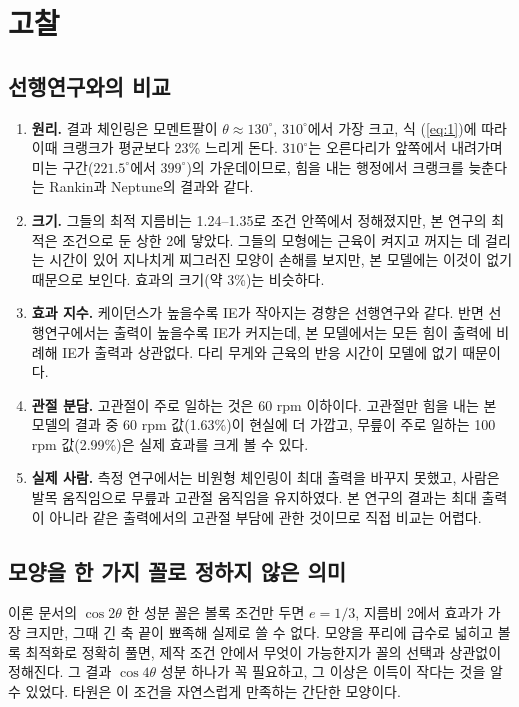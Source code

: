 \section{고찰}

\subsection{선행연구와의 비교}
\begin{enumerate}
\item \textbf{원리.} 결과 체인링은 모멘트팔이 \(\theta\approx130^\circ\), \(310^\circ\)에서 가장 크고, 식 (\ref{eq:1})에 따라 이때 크랭크가 평균보다 23\% 느리게 돈다. \(310^\circ\)는 오른다리가 앞쪽에서 내려가며 미는 구간(\(221.5^\circ\)에서 \(399^\circ\))의 가운데이므로, 힘을 내는 행정에서 크랭크를 늦춘다는 Rankin과 Neptune의 결과\cite{rankin2008}와 같다.
\item \textbf{크기.} 그들의 최적 지름비는 1.24--1.35로 조건 안쪽에서 정해졌지만, 본 연구의 최적은 조건으로 둔 상한 2에 닿았다. 그들의 모형에는 근육이 켜지고 꺼지는 데 걸리는 시간이 있어 지나치게 찌그러진 모양이 손해를 보지만, 본 모델에는 이것이 없기 때문으로 보인다. 효과의 크기(약 3\%)는 비슷하다.
\item \textbf{효과 지수.} 케이던스가 높을수록 IE가 작아지는 경향은 선행연구\cite{bini2013}와 같다. 반면 선행연구에서는 출력이 높을수록 IE가 커지는데, 본 모델에서는 모든 힘이 출력에 비례해 IE가 출력과 상관없다. 다리 무게와 근육의 반응 시간이 모델에 없기 때문이다.
\item \textbf{관절 분담.} 고관절이 주로 일하는 것은 60 rpm 이하이다\cite{aasvold2019}. 고관절만 힘을 내는 본 모델의 결과 중 60 rpm 값(1.63\%)이 현실에 더 가깝고, 무릎이 주로 일하는 100 rpm 값(2.99\%)은 실제 효과를 크게 볼 수 있다.
\item \textbf{실제 사람.} 측정 연구에서는 비원형 체인링이 최대 출력을 바꾸지 못했고, 사람은 발목 움직임으로 무릎과 고관절 움직임을 유지하였다\cite{leong2017}. 본 연구의 결과는 최대 출력이 아니라 같은 출력에서의 고관절 부담에 관한 것이므로 직접 비교는 어렵다.
\end{enumerate}

\subsection{모양을 한 가지 꼴로 정하지 않은 의미}
이론 문서의 \(\cos2\theta\) 한 성분 꼴은 볼록 조건만 두면 \(e=1/3\), 지름비 2에서 효과가 가장 크지만, 그때 긴 축 끝이 뾰족해 실제로 쓸 수 없다. 모양을 푸리에 급수로 넓히고 볼록 최적화로 정확히 풀면, 제작 조건 안에서 무엇이 가능한지가 꼴의 선택과 상관없이 정해진다. 그 결과 \(\cos4\theta\) 성분 하나가 꼭 필요하고, 그 이상은 이득이 작다는 것을 알 수 있었다. 타원은 이 조건을 자연스럽게 만족하는 간단한 모양이다.


